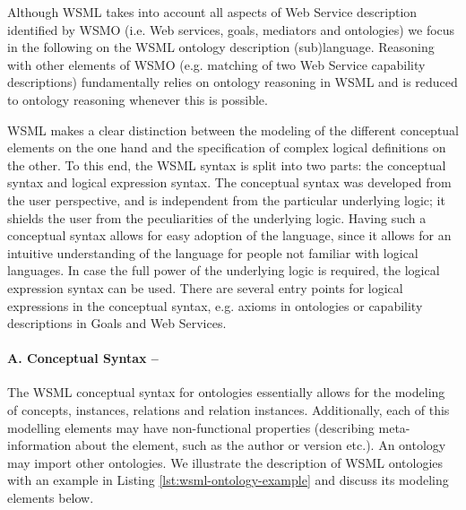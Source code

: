 Although WSML takes into account all aspects of Web Service
description identified by WSMO (i.e. Web services, goals,
mediators and ontologies) we focus in the following on the WSML
ontology description (sub)language. Reasoning with other elements
of WSMO (e.g. matching of two Web Service capability descriptions)
fundamentally relies on ontology reasoning in WSML and is reduced
to ontology reasoning whenever this is possible.

WSML makes a clear distinction between the modeling of the
different conceptual elements on the one hand and the
specification of complex logical definitions on the other. To this
end, the WSML syntax is split into two parts: the conceptual
syntax and logical expression syntax. The conceptual syntax was
developed from the user perspective, and is independent from the
particular underlying logic; it shields the user from the
peculiarities of the underlying logic. Having such a conceptual
syntax allows for easy adoption of the language, since it allows
for an intuitive understanding of the language for people not
familiar with logical languages. In case the full power of the
underlying logic is required, the logical expression syntax can be
used. There are several entry points for logical expressions in
the conceptual syntax, e.g. axioms in ontologies or capability
descriptions in Goals and Web Services.

\paragraph{A. Conceptual Syntax --}
\label{sec:conceptual-syntax}

The WSML conceptual syntax for ontologies essentially allows for
the modeling of concepts, instances, relations and relation
instances. Additionally, each of this modelling elements may have
non-functional properties (describing meta-information about the
element, such as the author or version etc.). An ontology may
import other ontologies. We illustrate the description of WSML
ontologies with an example in Listing
\ref{lst:wsml-ontology-example} and discuss its modeling elements
below.

%
%

